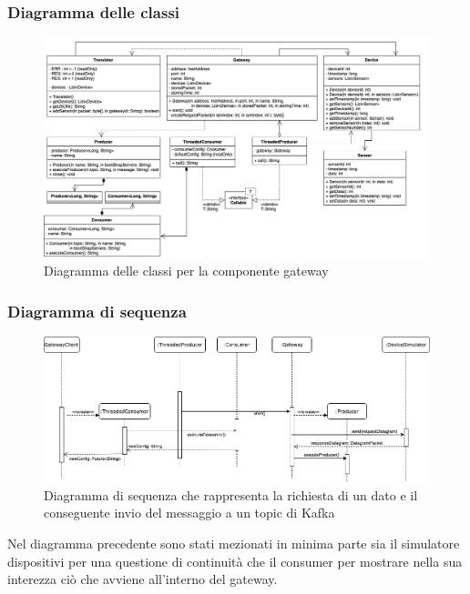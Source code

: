 		\begin{landscape}
	\subsubsection{Diagramma delle classi}%
	  	\begin{figure}[H]
			\centering
			\includegraphics[scale=0.500]{res/images/GATEWAY/ClassiGateway.png}
			\caption{Diagramma delle classi per la componente gateway}
		\end{figure}	
		\end{landscape}
		\begin{landscape}
	\subsubsection{Diagramma di sequenza}
	  	\begin{figure}[H]
			\centering
			\includegraphics[scale=0.500]{res/images/GATEWAY/RichiestaInvioGateway.png}
			\caption{Diagramma di sequenza che rappresenta la richiesta di un dato e il conseguente invio del messaggio a un topic di Kafka}
		\end{figure}
		
		Nel diagramma precedente sono stati mezionati in minima parte sia il simulatore dispositivi per una questione di continuità che il consumer per mostrare nella sua interezza ciò che avviene all'interno del gateway.
		\end{landscape}
